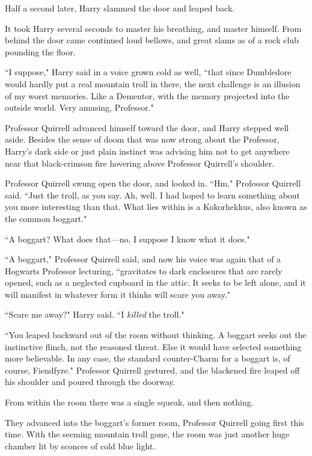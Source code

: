 \later

Half a second later, Harry slammed the door and leaped back.

It took Harry several seconds to master his breathing, and master himself. From behind the door came continued loud bellows, and great slams as of a rock club pounding the floor.

``I suppose," Harry said in a voice grown cold as well, ``that since Dumbledore would hardly put a real mountain troll in there, the next challenge is an illusion of my worst memories. Like a Dementor, with the memory projected into the outside world. Very amusing, Professor."

Professor Quirrell advanced himself toward the door, and Harry stepped well aside. Besides the sense of doom that was now strong about the Professor, Harry's dark side or just plain instinct was advising him not to get anywhere near that black-crimson fire hovering above Professor Quirrell's shoulder.

Professor Quirrell swung open the door, and looked in. ``Hm," Professor Quirrell said. ``Just the troll, as you say. Ah, well. I had hoped to learn something about you more interesting than that. What lies within is a Kokorhekkus, also known as the common boggart."

``A boggart? What does that---no, I suppose I know what it does."

``A boggart," Professor Quirrell said, and now his voice was again that of a Hogwarts Professor lecturing, ``gravitates to dark enclosures that are rarely opened, such as a neglected cupboard in the attic. It seeks to be left alone, and it will manifest in whatever form it thinks will scare you away."

``Scare me away?" Harry said. ``I \emph{killed} the troll."

``You leaped backward out of the room without thinking. A boggart seeks out the instinctive flinch, not the reasoned threat. Else it would have selected something more believable. In any case, the standard counter-Charm for a boggart is, of course, Fiendfyre." Professor Quirrell gestured, and the blackened fire leaped off his shoulder and poured through the doorway.

From within the room there was a single squeak, and then nothing.

They advanced into the boggart's former room, Professor Quirrell going first this time. With the seeming mountain troll gone, the room was just another huge chamber lit by sconces of cold blue light.

